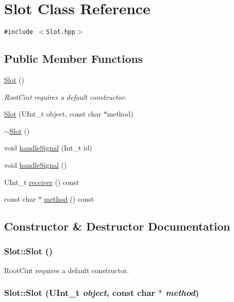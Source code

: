 \hypertarget{classSlot}{
\section{Slot Class Reference}
\label{classSlot}
}
{\tt \#include $<$Slot.hpp$>$}

\subsection*{Public Member Functions}
\begin{CompactItemize}
\item 
\hyperlink{classSlot_a0}{Slot} ()
\begin{CompactList}\small\item\em Root\-Cint requires a default constructor. \item\end{CompactList}\item 
\hyperlink{classSlot_a1}{Slot} (UInt\_\-t object, const char $\ast$method)
\item 
\hyperlink{classSlot_a2}{$\sim$Slot} ()
\item 
void \hyperlink{classSlot_a3}{handle\-Signal} (Int\_\-t id)
\item 
void \hyperlink{classSlot_a4}{handle\-Signal} ()
\item 
UInt\_\-t \hyperlink{classSlot_a5}{receiver} () const 
\item 
const char $\ast$ \hyperlink{classSlot_a6}{method} () const 
\end{CompactItemize}


\subsection{Constructor \& Destructor Documentation}
\hypertarget{classSlot_a0}{
\subsubsection[Slot]{\setlength{\rightskip}{0pt plus 5cm}Slot::Slot ()}}
\label{classSlot_a0}


Root\-Cint requires a default constructor. 

\hypertarget{classSlot_a1}{
\subsubsection[Slot]{\setlength{\rightskip}{0pt plus 5cm}Slot::Slot (UInt\_\-t {\em object}, const char $\ast$ {\em method})}}
\label{classSlot_a1}


